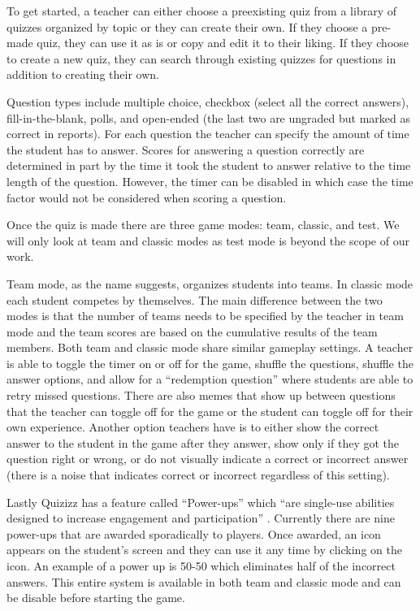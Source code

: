 \documentclass{article}
\begin{document}
        To get started, a teacher can either choose a preexisting quiz from a library of quizzes organized by topic or they can create their own. If they choose a pre-made quiz, they can use it as is or copy and edit it to their liking. If they choose to create a new quiz, they can search through existing quizzes for questions in addition to creating their own.
        \smallskip
        
        Question types include multiple choice, checkbox (select all the correct answers), fill-in-the-blank, polls, and open-ended (the last two are ungraded but marked as correct in reports). For each question the teacher can specify the amount of time the student has to answer. Scores for answering a question correctly are determined in part by the time it took the student to answer relative to the time length of the question. However, the timer can be disabled in which case the time factor would not be considered when scoring a question.
        \smallskip
        
        Once the quiz is made there are three game modes: team, classic, and test. We will only look at team and classic modes as test mode is beyond the scope of our work.
        \smallskip
        
        Team mode, as the name suggests, organizes students into teams. In classic mode each student competes by themselves. The main difference between the two modes is that the number of teams needs to be specified by the teacher in team mode and the team scores are based on the cumulative results of the team members. Both team and classic mode share similar gameplay settings. A teacher is able to toggle the timer on or off for the game, shuffle the questions, shuffle the answer options, and allow for a ``redemption question'' where students are able to retry missed questions. There are also memes that show up between questions that the teacher can toggle off for the game or the student can toggle off for their own experience. Another option teachers have is to either show the correct answer to the student in the game after they answer, show only if they got the question right or wrong, or do not visually indicate a correct or incorrect answer (there is a noise that indicates correct or incorrect regardless of this setting).
        \smallskip
        
        Lastly Quizizz has a feature called ``Power-ups'' which ``are single-use abilities designed to increase engagement and participation'' \cite{quizizz}. Currently there are nine power-ups that are awarded sporadically to players. Once awarded, an icon appears on the student's screen and they can use it any time by clicking on the icon. An example of a power up is 50-50 which eliminates half of the incorrect answers. This entire system is available in both team and classic mode and can be disable before starting the game.
        \smallskip
        
\end{document}
